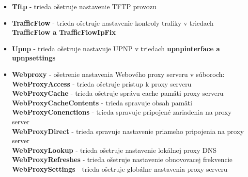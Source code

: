 \begin{itemize}
\item \textbf{Tftp} - trieda ošetruje nastavenie TFTP provozu
\item \textbf{TrafficFlow} - trieda ošetruje nastavenie kontroly trafiky v triedach \textbf{TrafficFlow a TrafficFlowIpFix}
\item \textbf{Upnp} - trieda ošetruje nastavuje UPNP v triedach \textbf{upnpinterface a upnpsettings} 
\item \textbf{Webproxy} - ošetrenie nastavenia Webového proxy serveru v súboroch:\\
\textbf{WebProxyAccess} - trieda ošetruje prístup k proxy serveru\\
\textbf{WebProxyCache} - trieda ošetruje správu cache pamäti proxy serveru\\
\textbf{WebProxyCacheContents} - trieda spravuje obsah pamäti\\
\textbf{WebProxyConenctions} - trieda spravuje pripojené zariadenia na proxy server\\
\textbf{WebProxyDirect} - trieda spravuje nastavenie priameho pripojenia na proxy server\\
\textbf{WebProxyLookup} - trieda ošetruje nastavenie lokálnej proxy DNS\\
\textbf{WebProxyRefreshes} - trieda ošetruje nastavenie obnovovacej frekvencie\\
\textbf{WebProxySettings} - trieda ošetruje globálne nastavenia proxy serveru
\end{itemize}
